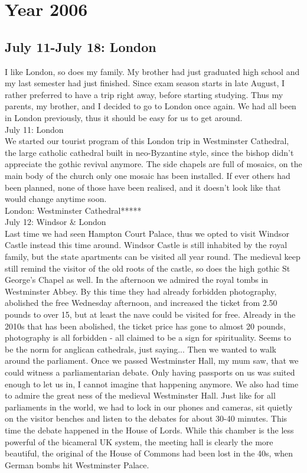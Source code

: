 \chapter{Year 2006}
\label{2006}


\section{July 11-July 18: London}
\label{2006:London}

I like London, so does my family. My brother had just graduated high school and my last semester had just finished. Since exam season starts in late August, I rather preferred to have a trip right away, before starting studying. Thus my parents, my brother, and I decided to go to London once again. We had all been in London previously, thus it should be easy for us to get around.\\

July 11: London\\
We started our tourist program of this London trip in Westminster Cathedral, the large catholic cathedral built in neo-Byzantine style, since the bishop didn't appreciate the gothic revival anymore. The side chapels are full of mosaics, on the main body of the church only one mosaic has been installed. If ever others had been planned, none of those have been realised, and it doesn't look like that would change anytime soon.\\

London: Westminster Cathedral*****\\

July 12: Windsor \& London\\
Last time we had seen Hampton Court Palace, thus we opted to visit Windsor Castle instead this time around. Windsor Castle is still inhabited by the royal family, but the state apartments can be visited all year round. The medieval keep still remind the visitor of the old roots of the castle, so does the high gothic St George's Chapel as well. In the afternoon we admired the royal tombs in Westminster Abbey. By this time they had already forbidden photography, abolished the free Wednesday afternoon, and increased the ticket from 2.50 pounds to over 15, but at least the nave could be visited for free. Already in the 2010s that has been abolished, the ticket price has gone to almost 20 pounds, photography is all forbidden - all claimed to be a sign for spirituality. Seems to be the norm for anglican cathedrals, just saying... Then we wanted to walk around the parliament. Once we passed Westminster Hall, my mum saw, that we could witness a parliamentarian debate. Only having passports on us was suited enough to let us in, I cannot imagine that happening anymore. We also had time to admire the great ness of the medieval Westminster Hall. Just like for all parliaments in the world, we had to lock in our phones and cameras, sit quietly on the visitor benches and listen to the debates for about 30-40 minutes. This time the debate happened in the House of Lords. While this chamber is the less powerful of the bicameral UK system, the meeting hall is clearly the more beautiful, the original of the House of Commons had been lost in the 40s, when German bombs hit Westminster Palace.\\


